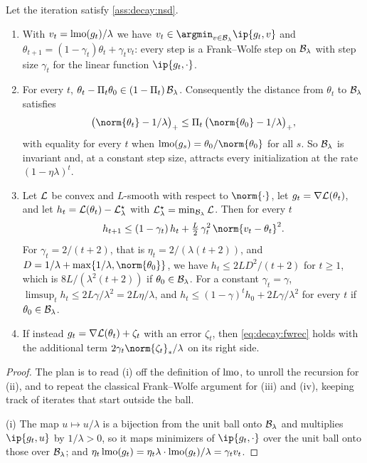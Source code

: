 \begin{refsection}
\begin{theorem}\label{thm:decay:frankwolfe}
Let the iteration satisfy \cref{ass:decay:nsd}.
\begin{enumerate}
\item With $v_t=\operatorname{lmo}(g_t)/\lambda$ we have $v_t\in\argmin_{v\in\decayball}\ip{g_t,v}$ and $\theta_{t+1}=(1-\gamma_t)\theta_t+\gamma_tv_t$: every step is a Frank--Wolfe step on $\mathcal{B}_\lambda$ with step size $\gamma_t$ for the linear function $\ip{g_t,\cdot}$.
\item For every $t$, $\theta_t-\Pi_t\theta_0\in(1-\Pi_t)\,\mathcal{B}_\lambda$. Consequently the distance from $\theta_t$ to $\mathcal{B}_\lambda$ satisfies
\[
  \bigl(\norm{\theta_t}-1/\lambda\bigr)_+\le\Pi_t\,\bigl(\norm{\theta_0}-1/\lambda\bigr)_+ ,
\]
with equality for every $t$ when $\lmo(g_s)=\theta_0/\norm{\theta_0}$ for all $s$. So $\mathcal{B}_\lambda$ is invariant and, at a constant step size, attracts every initialization at the rate $(1-\eta\lambda)^t$.
\item Let $\mathcal{L}$ be convex and $L$-smooth with respect to $\norm{\cdot}$, let $g_t=\nabla\mathcal{L}(\theta_t)$, and let $h_t=\mathcal{L}(\theta_t)-\mathcal{L}^\star_\lambda$ with $\mathcal{L}^\star_\lambda=\min_{\mathcal{B}_\lambda}\mathcal{L}$. Then for every $t$
\begin{equation}\label{eq:decay:fwrec}
  h_{t+1}\le(1-\gamma_t)\,h_t+\tfrac L2\,\gamma_t^2\,\norm{v_t-\theta_t}^2 .
\end{equation}
For $\gamma_t=2/(t+2)$, that is $\eta_t=2/(\lambda(t+2))$, and $D=1/\lambda+\max\{1/\lambda,\norm{\theta_0}\}$, we have $h_t\le2LD^2/(t+2)$ for $t\ge1$, which is $8L/(\lambda^2(t+2))$ if $\theta_0\in\mathcal{B}_\lambda$. For a constant $\gamma_t=\gamma$, $\limsup_th_t\le2L\gamma/\lambda^2=2L\eta/\lambda$, and $h_t\le(1-\gamma)^th_0+2L\gamma/\lambda^2$ for every $t$ if $\theta_0\in\mathcal{B}_\lambda$.
\item If instead $g_t=\nabla\mathcal{L}(\theta_t)+\zeta_t$ with an error $\zeta_t$, then \eqref{eq:decay:fwrec} holds with the additional term $2\gamma_t\norm{\zeta_t}_*/\lambda$ on its right side.
\end{enumerate}
\end{theorem}

\begin{proof}
The plan is to read (i) off the definition of $\operatorname{lmo}$, to unroll the recursion for (ii), and to repeat the classical Frank--Wolfe argument for (iii) and (iv), keeping track of iterates that start outside the ball.

(i) The map $u\mapsto u/\lambda$ is a bijection from the unit ball onto $\mathcal{B}_\lambda$ and multiplies $\ip{g_t,u}$ by $1/\lambda>0$, so it maps minimizers of $\ip{g_t,\cdot}$ over the unit ball onto those over $\mathcal{B}_\lambda$; and $\eta_t\operatorname{lmo}(g_t)=\eta_t\lambda\cdot\operatorname{lmo}(g_t)/\lambda=\gamma_tv_t$.


\end{proof}
\end{refsection}
